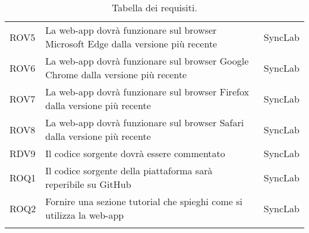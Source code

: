 \begin{center}
\begin{longtable}{ |p{1.5cm}|p{9cm}|p{1.5cm}|  }
        ROV5&La web-app dovrà funzionare sul browser Microsoft Edge dalla versione più recente&SyncLab\\
        ROV6&La web-app dovrà funzionare sul browser Google Chrome dalla versione più recente&SyncLab\\
        ROV7&La web-app dovrà funzionare sul browser Firefox dalla versione più recente&SyncLab\\
        ROV8&La web-app dovrà funzionare sul browser Safari dalla versione più recente&SyncLab\\
        RDV9&Il codice sorgente dovrà essere commentato&SyncLab\\
        ROQ1&Il codice sorgente della piattaforma sarà reperibile su GitHub&SyncLab\\
        ROQ2&Fornire una sezione tutorial che spieghi come si utilizza la web-app&SyncLab\\
\hline
\caption{\label{tab:tabella dei requisiti}Tabella dei requisiti.}
\end{longtable}
\end{center}